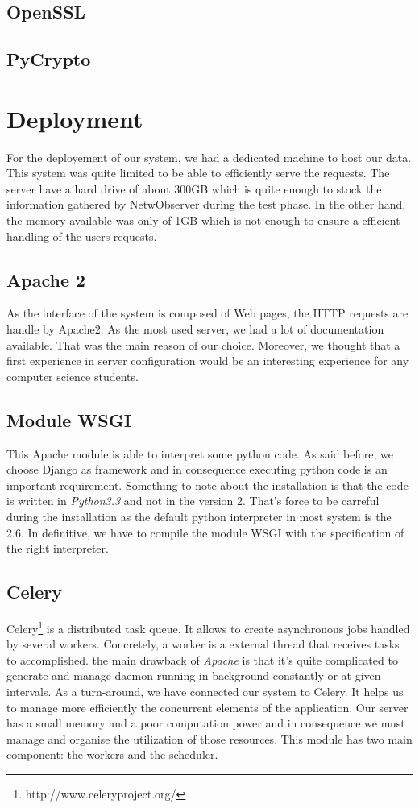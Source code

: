 \subsection{OpenSSL}
\subsection{PyCrypto}

\section{Deployment}
For the deployement of our system, we had a dedicated machine to host our data. This system was quite limited to be able to efficiently serve the requests. The server have a hard drive of about 300GB which is quite enough to stock the information gathered by NetwObserver during the test phase. In the other hand, the memory available was only of 1GB which is not enough to ensure a efficient handling of the users requests.

\subsection{Apache 2}
As the interface of the system is composed of Web pages, the HTTP requests are handle by Apache2. As the most used server, we had a lot of documentation available. That was the main reason of our choice. Moreover, we thought that a first experience in server configuration would be an interesting experience for any computer science students.

\subsection{Module WSGI}
This Apache module is able to interpret some python code. As said before, we choose Django as framework and in consequence executing python code is an important requirement. Something to note about the installation is that the code is written in \emph{Python3.3} and not in the version 2. That's force to be carreful during the installation as the default python interpreter in most system is the 2.6. In definitive, we have to compile the module WSGI with the specification of the right interpreter.

\subsection{Celery}
Celery\footnote{http://www.celeryproject.org/} is a distributed task queue. It allows to create asynchronous jobs handled by several workers. Concretely, a worker is a external thread that receives tasks to accomplished. the main drawback of \emph{Apache} is that it's quite complicated to generate and manage daemon running in background constantly or at given intervals. As a turn-around, we have connected our system to Celery. It helps us to manage more efficiently the concurrent elements of the application. Our server has a small memory and a poor computation power and in consequence we must manage and organise the utilization of those resources. This module has two main component: the workers and the scheduler.

